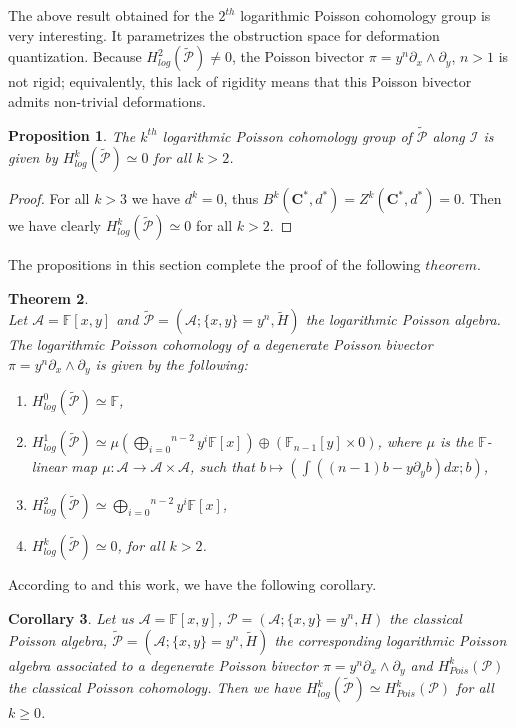 \documentclass[a4paper, 12pt,oneside,reqno]{amsart}
\newtheorem{theorem}{Theorem}[section]
\newtheorem{proposition}[theorem]{Proposition}
\newtheorem{corollary}[theorem]{Corollary}
\theoremstyle{definition}
\begin{document}
  The above result obtained for the $2^{th}$ logarithmic Poisson cohomology group is very interesting.
  It parametrizes the obstruction space for deformation quantization.
   Because $H_{log}^{2}(\tilde{\mathcal{P}})\neq 0$, the Poisson bivector $\pi = y^n\partial_{x}\wedge \partial_{y}$, $n>1$ is not rigid; equivalently, this lack of rigidity means that this Poisson bivector admits non-trivial deformations. \\
      
     \begin{proposition}
     The  $k^{th}$  logarithmic Poisson cohomology group of $\tilde{\mathcal{P}}$ along $\mathcal{I}$ is given by
     $H_{log}^{k}(\tilde{\mathcal{P}}) \simeq 0$ for all $k>2$.
      \end{proposition}
      \begin{proof}
          For all $k>3$ we have $d^k=0$, thus 
         $B^{k}(\textbf{C}^{*},d^{*})= Z^{k}(\textbf{C}^{*},d^{*})=0$. Then we have clearly
           $H_{log}^{k}(\tilde{\mathcal{P}}) \simeq 0$ for all  $k>2$.
      \end{proof}
   The propositions in this section complete the proof of the following $theorem$.
 \begin{theorem} $\label{T3}$\\
 Let $\mathcal{A}=\mathbb{F}[x,y]$ and  $\tilde{\mathcal{P}}=(\mathcal{A};\{x,y\}=y^n, \tilde{H})$ the logarithmic Poisson algebra. The logarithmic Poisson cohomology of a degenerate Poisson bivector $\pi = y^n\partial_{x}\wedge \partial_{y}$ is given by the following:
  \begin{enumerate}
    \item[1.]  $H_{log}^{0}(\tilde{\mathcal{P}}) \simeq \mathbb{F}$,
  \item[2.]  $H_{log}^{1}(\tilde{\mathcal{P}}) \simeq  \mu (\overset{n-2}{\underset{i=0}{\bigoplus}}y^{i} \mathbb{F}[x])\oplus ( \mathbb{F}_{n-1}[y]\times 0)$, where $\mu$ is the  $\mathbb{F}$-linear map  $\mu : \mathcal{A} \longrightarrow \mathcal{A}\times \mathcal{A}$, such that $b \mapsto \left(\int ((n-1)b - y\partial_{y}b)dx; b\right)$,  \item[3.] $H_{log}^{2}(\tilde{\mathcal{P}}) \simeq \overset{n-2}{\underset{i=0}{\bigoplus}}y^{i} \mathbb{F}[x]$,
      \item[4.]  $H_{log}^{k}(\tilde{\mathcal{P}}) \simeq 0$, for all $k>2$. 
  \end{enumerate}
 \end{theorem}
 According to \cite{BI} and this work, we have the following corollary.
\begin{corollary} Let us $\mathcal{A}=\mathbb{F}[x,y]$, $\mathcal{P}=(\mathcal{A};\{x,y\}=y^n, H)$ the classical Poisson algebra,  $\tilde{\mathcal{P}}=(\mathcal{A};\{x,y\}=y^n, \tilde{H})$ the corresponding logarithmic Poisson algebra associated to a degenerate Poisson bivector $\pi = y^n\partial_{x}\wedge \partial_{y}$ and $H_{Pois}^{k}(\mathcal{P})$ the classical Poisson cohomology.
Then we have  $H_{log}^{k}(\tilde{\mathcal{P}}) \simeq H_{Pois}^{k}(\mathcal{P})$ for all $k\geqslant 0$.
 \end{corollary}
\end{document}
